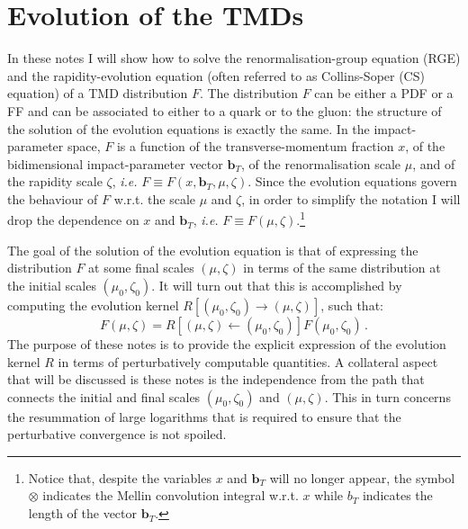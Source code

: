 \documentclass[10pt,a4paper]{article}
\begin{document}
\section{Evolution of the TMDs}

In these notes I will show how to solve the renormalisation-group
equation (RGE) and the rapidity-evolution equation (often referred to
as Collins-Soper (CS) equation) of a TMD distribution $F$. The
distribution $F$ can be either a PDF or a FF and can be associated to
either to a quark or to the gluon: the structure of the solution of
the evolution equations is exactly the same. In the impact-parameter
space, $F$ is a function of the transverse-momentum fraction $x$, of
the bidimensional impact-parameter vector $\mathbf{b}_T$, of the
renormalisation scale $\mu$, and of the rapidity scale $\zeta$,
\textit{i.e.}  $F\equiv F(x, \mathbf{b}_T,\mu,\zeta)$. Since the
evolution equations govern the behaviour of $F$ w.r.t. the scale $\mu$
and $\zeta$, in order to simplify the notation I will drop the
dependence on $x$ and $\mathbf{b}_T$, \textit{i.e.}
$F\equiv F(\mu,\zeta)$.\footnote{Notice that, despite the variables
  $x$ and $\mathbf{b}_T$ will no longer appear, the symbol $\otimes$
  indicates the Mellin convolution integral w.r.t. $x$ while $b_T$
  indicates the length of the vector $\mathbf{b}_T$.}

The goal of the solution of the evolution equation is that of
expressing the distribution $F$ at some final scales $(\mu,\zeta)$ in
terms of the same distribution at the initial scales
$(\mu_0,\zeta_0)$. It will turn out that this is accomplished by
computing the evolution kernel $R\left[(\mu_0,\zeta_0)\rightarrow
  (\mu,\zeta)\right]$, such that:
\begin{equation}\label{eq:evkernel}
  F(\mu,\zeta) = R\left[(\mu,\zeta)\leftarrow
    (\mu_0,\zeta_0)\right]F(\mu_0,\zeta_0)\,.
\end{equation}
The purpose of these notes is to provide the explicit expression of
the evolution kernel $R$ in terms of perturbatively computable
quantities. A collateral aspect that will be discussed is these notes
is the independence from the path that connects the initial and final
scales $(\mu_0,\zeta_0)$ and $(\mu,\zeta)$. This in turn concerns the
resummation of large logarithms that is required to ensure that the
perturbative convergence is not spoiled.
\end{document}

